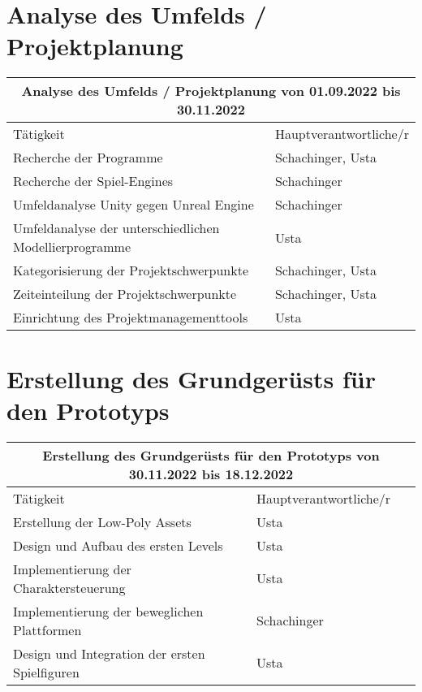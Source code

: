 \section{Analyse des Umfelds / Projektplanung}
\begin{tabular}{|m{}|m{}|}
\hline
\multicolumn{2}{|c|}{\textbf{Analyse des Umfelds / Projektplanung von 01.09.2022 bis 30.11.2022}} \\
\hline
Tätigkeit & Hauptverantwortliche/r \\
\hline
Recherche der Programme & Schachinger, Usta \\
\hline
Recherche der Spiel-Engines & Schachinger \\
\hline
Umfeldanalyse Unity gegen Unreal Engine & Schachinger \\
\hline
Umfeldanalyse der unterschiedlichen Modellierprogramme & Usta \\
\hline
Kategorisierung der Projektschwerpunkte & Schachinger, Usta \\
\hline
Zeiteinteilung der Projektschwerpunkte & Schachinger, Usta \\
\hline
Einrichtung des Projektmanagementtools & Usta \\
\hline
\end{tabular}

\section{Erstellung des Grundgerüsts für den Prototyps}
\begin{tabular}{|m{}|m{}|}
\hline
\multicolumn{2}{|c|}{\textbf{Erstellung des Grundgerüsts für den Prototyps von 30.11.2022 bis 18.12.2022}} \\
\hline
Tätigkeit & Hauptverantwortliche/r \\
\hline
Erstellung der Low-Poly Assets & Usta \\
\hline
Design und Aufbau des ersten Levels & Usta \\
\hline
Implementierung der Charaktersteuerung & Usta \\
\hline
Implementierung der beweglichen Plattformen & Schachinger \\
\hline
Design und Integration der ersten Spielfiguren & Usta \\
\hline
\end{tabular}

